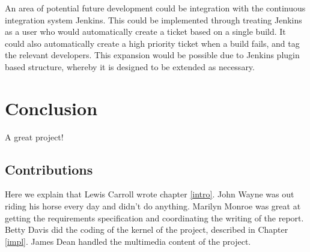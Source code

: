 \documentclass[a4paper]{l3proj}
\begin{document}
An area of potential future development could be integration with the continuous integration system Jenkins.  This 
could be implemented through treating Jenkins as a user who would automatically create a ticket based on a single build.  
It could also automatically create a high priority ticket when a build fails, and tag the relevant developers.  This 
expansion would be possible due to Jenkins plugin based structure, whereby it is designed to be extended as necessary.

\chapter{Conclusion}

A great project!

\section{Contributions}

Here we explain that Lewis Carroll wrote chapter \ref{intro}. John Wayne
was out riding his horse every day and didn't do anything. Marilyn Monroe
was great at getting the requirements specification and coordinating the
writing of the report. Betty Davis did the coding of the kernel of the
project, described in Chapter \ref{impl}.  James Dean handled the
multimedia content of the project.



\end{document}
